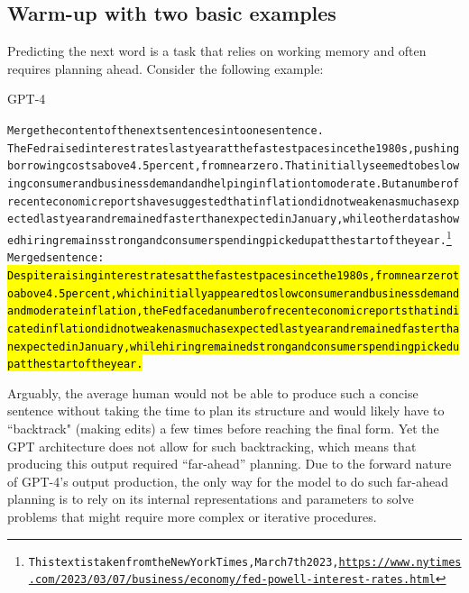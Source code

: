 \subsection{Warm-up with two basic examples} Predicting the next word is a task that relies on working memory and often requires planning ahead. Consider the following example:

\begin{AIbox}{GPT-4}
\scriptsize
\parbox{1\textwidth}{
\begin{alltt}
Merge the content of the next sentences into one sentence. \\

The Fed raised interest rates last year at the fastest pace since the 1980s, pushing borrowing costs above 4.5 percent, from near zero. That initially seemed to be slowing consumer and business demand and helping inflation to moderate. But a number of recent economic reports have suggested that inflation did not weaken as much as expected last year and remained faster than expected in January, while other data showed hiring remains strong and consumer spending picked up at the start of the year.\footnote{This text is taken from the New York Times, March 7th 2023, \url{https://www.nytimes.com/2023/03/07/business/economy/fed-powell-interest-rates.html}} \\

Merged sentence: \\

\hl{ Despite raising interest rates at the fastest pace since the 1980s, from near zero to above 4.5 percent, which initially appeared to slow consumer and business demand and moderate inflation, the Fed faced a number of recent economic reports that indicated inflation did not weaken as much as expected last year and remained faster than expected in January, while hiring remained strong and consumer spending picked up at the start of the year.}
\end{alltt}
}
\end{AIbox}

Arguably, the average human would not be able to produce such a concise sentence without taking the time to plan its structure and would likely have to ``backtrack" (making edits) a few times before reaching the final form. Yet the GPT architecture does not allow for such backtracking, which means that producing this output required ``far-ahead'' planning. Due to the forward nature of GPT-4's output production, the only way for the model to do such far-ahead planning is to rely on its internal representations and parameters to solve problems that might require more complex or iterative procedures. 

